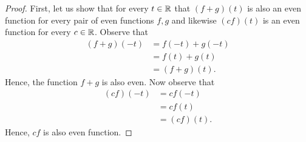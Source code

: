 \begin{proof}
    First, let us show that for every \( t \in \mathbb{R}  \) that \( (f+g)(t)  \) is also an even function for every pair of even functions \( f,g  \) and likewise \( (cf)(t)  \) is an even function for every \( c \in \mathbb{R}  \). Observe that 
    \begin{align*}
        (f+g)(-t) &= f(-t) + g(-t) \\
                  &= f(t) + g(t) \\
                  &= (f+g)(t).
    \end{align*}
    Hence, the function \( f + g  \) is also even. Now observe that 
    \begin{align*}
        (cf)(-t) &= cf(-t)  \\
                 &= c f(t) \\
                 &= (cf)(t).
    \end{align*}
    Hence, \( cf  \) is also even function.


\end{proof}
